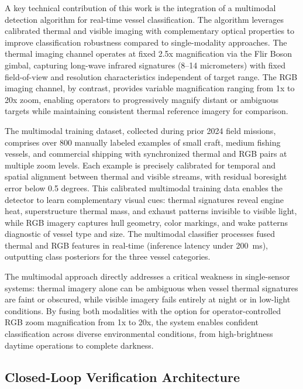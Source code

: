 \documentclass[conf]{asmeconf}
\begin{document}
A key technical contribution of this work is the integration of a multimodal detection algorithm for real-time vessel classification. The algorithm leverages calibrated thermal and visible imaging with complementary optical properties to improve classification robustness compared to single-modality approaches. The thermal imaging channel operates at fixed 2.5x magnification via the Flir Boson gimbal, capturing long-wave infrared signatures (8--14 micrometers) with fixed field-of-view and resolution characteristics independent of target range. The RGB imaging channel, by contrast, provides variable magnification ranging from 1x to 20x zoom, enabling operators to progressively magnify distant or ambiguous targets while maintaining consistent thermal reference imagery for comparison.

The multimodal training dataset, collected during prior 2024 field missions, comprises over 800 manually labeled examples of small craft, medium fishing vessels, and commercial shipping with synchronized thermal and RGB pairs at multiple zoom levels. Each example is precisely calibrated for temporal and spatial alignment between thermal and visible streams, with residual boresight error below 0.5 degrees. This calibrated multimodal training data enables the detector to learn complementary visual cues: thermal signatures reveal engine heat, superstructure thermal mass, and exhaust patterns invisible to visible light, while RGB imagery captures hull geometry, color markings, and wake patterns diagnostic of vessel type and size. The multimodal classifier processes fused thermal and RGB features in real-time (inference latency under \SI{200}{ms}), outputting class posteriors for the three vessel categories.

The multimodal approach directly addresses a critical weakness in single-sensor systems: thermal imagery alone can be ambiguous when vessel thermal signatures are faint or obscured, while visible imagery fails entirely at night or in low-light conditions. By fusing both modalities with the option for operator-controlled RGB zoom magnification from 1x to 20x, the system enables confident classification across diverse environmental conditions, from high-brightness daytime operations to complete darkness.

\subsection{Closed-Loop Verification Architecture}
\end{document}
